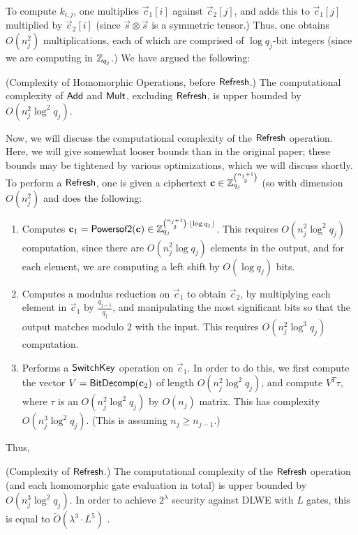         To compute $k_{i,j}$, one multiplies $\vec{c}_1[i]$ against $\vec{c}_2[j]$, and adds this to $\vec{c}_1[j]$ multiplied by $\vec{c}_2[i]$ (since $\vec{s} \otimes \vec{s}$ is a symmetric tensor.) Thus, one obtains $O(n_j^2)$ multiplications, each of which are comprised of $\log q_j$-bit integers (since we are computing in $\Z_{q_j}$.) We have argued the following:

        \begin{lemma} (Complexity of Homomorphic Operations, before ${\sf Refresh}$.)
            The computational complexity of ${\sf Add}$ and ${\sf Mult}$, excluding ${\sf Refresh}$, is upper bounded by $O(n_j^2 \log^2 q_j)$.
        \end{lemma}

        Now, we will discuss the computational complexity of the ${\sf Refresh}$ operation. Here, we will give somewhat looser bounds than in the original paper; these bounds may be tightened by various optimizations, which we will discuss shortly.
        To perform a ${\sf Refresh}$, one is given a ciphertext $\vec{c} \in \Z_{q_j}^{{n_j+1}\choose{2}}$ (so with dimension $O(n_j^2)$ and does the following:
        \begin{enumerate}
            \item Computes $\vec{c}_1 = {\sf Powersof2}(\vec{c}) \in \Z_{q_j}^{{{n_j + 1} \choose{2}} \cdot \lfloor \log q_j \rfloor}$. This requires $O(n_j^2 \log^2 q_j)$ computation, since there are $O(n_j^2 \log q_j)$ elements in the output, and for each element, we are computing a left shift by $O(\log q_j)$ bits.

            \item Computes a modulus reduction on $\vec{c}_1$ to obtain $\vec{c}_2$, by multiplying each element in $\vec{c}_1$ by $\frac{q_{j-1}}{q_j}$, and manipulating the most significant bits so that the output matches modulo $2$ with the input. This requires $O(n_j^2 \log^3 q_j)$ computation.

            \item Performs a ${\sf SwitchKey}$ operation on $\vec{c}_1$. In order to do this, we first compute the vector $V = {\sf BitDecomp}(\vec{c}_2)$ of length $O(n_j^2 \log^2 q_j)$, and compute $V^T \tau$, where $\tau$ is an $O(n_j^2 \log^2 q_j)$ by $O(n_j)$ matrix. This has complexity $O(n_j^3 \log^2 q_j)$. (This is assuming $n_j \geq n_{j-1}$.)
        \end{enumerate}
        Thus,
        \begin{lemma} \label{lem: refreshcomplexity} (Complexity of ${\sf Refresh}$.)
            The computational complexity of the ${\sf Refresh}$ operation (and each homomorphic gate evaluation in total) is upper bounded by $O(n_j^3 \log^2 q_j)$. In order to achieve $2^\lambda$ security against DLWE with $L$ gates, this is equal to $\widetilde{O}(\lambda^3 \cdot L^5)$ \cite{bgv2011}.
        \end{lemma}

